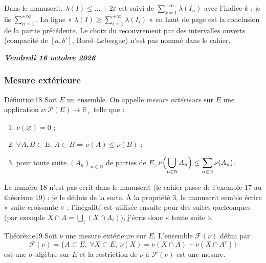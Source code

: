 \documentclass[11pt,a4paper]{article}
\newcommand{\N}{\mathbb{N}}
\newcommand{\Rb}{\overline{\mathbb{R}}}
\newcommand{\Pp}{\mathscr{P}}
\newcommand{\Ff}{\mathscr{F}}
\newcommand{\datepage}[1]{\begin{flushright}\small\bfseries\itshape\color{bleuclair}#1\end{flushright}\vspace{-8pt}}
\begin{document}
\begin{note}
Dans le manuscrit, $\lambda(I)\le\dots+2\varepsilon$ est suivi de $\sum_{k=1}^{+\infty}\lambda(I_n)$ avec l'indice $k$ ; je lis $\sum_{n=1}^{+\infty}$. La ligne « $\lambda(I)\ge\sum_{i=1}^{+\infty}\lambda(I_i)$ » en haut de page est la conclusion de la partie précédente.
Le choix du recouvrement par des intervalles ouverts (compacité de $[a,b']$, Borel--Lebesgue) n'est pas nommé dans le cahier.
\end{note}

\datepage{Vendredi 16 octobre 2026}
\subsubsection*{Mesure extérieure}

\begin{enonce}{Définition}{18}
Soit $E$ un ensemble. On appelle \emph{mesure extérieure} sur $E$ une application $\nu:\Pp(E)\to\Rb_+$ telle que :
\begin{enumerate}[label=\textbf{\arabic*-},leftmargin=1.2cm]
  \item $\nu(\varnothing)=0$ ;
  \item $\forall A,B\subset E$, $A\subset B\Rightarrow\nu(A)\le\nu(B)$ ;
  \item pour toute suite $(A_n)_{n\in\N}$ de parties de $E$,
        $\displaystyle\nu\Bigl(\bigcup_{n\in\N}A_n\Bigr)\le\sum_{n\in\N}\nu(A_n)$.
\end{enumerate}
\end{enonce}

\begin{note}
Le numéro 18 n'est pas écrit dans le manuscrit (le cahier passe de l'exemple 17 au théorème 19) ; je le déduis de la suite.
À la propriété 3, le manuscrit semble écrire « suite croissante » ; l'inégalité est utilisée ensuite pour des suites quelconques
(par exemple $X\cap A=\bigcup_i(X\cap A_i)$), j'écris donc « toute suite ».
\end{note}

\begin{enonce}{Théorème}{19}
Soit $\nu$ une mesure extérieure sur $E$. L'ensemble $\Ff(\nu)$ défini par
\[
  \Ff(\nu)=\bigl\{A\subset E,\ \forall X\subset E,\ \nu(X)=\nu(X\cap A)+\nu(X\cap A^c)\bigr\}
\]
est une $\sigma$-algèbre sur $E$ et la restriction de $\nu$ à $\Ff(\nu)$ est une mesure.
\end{enonce}
\end{document}

